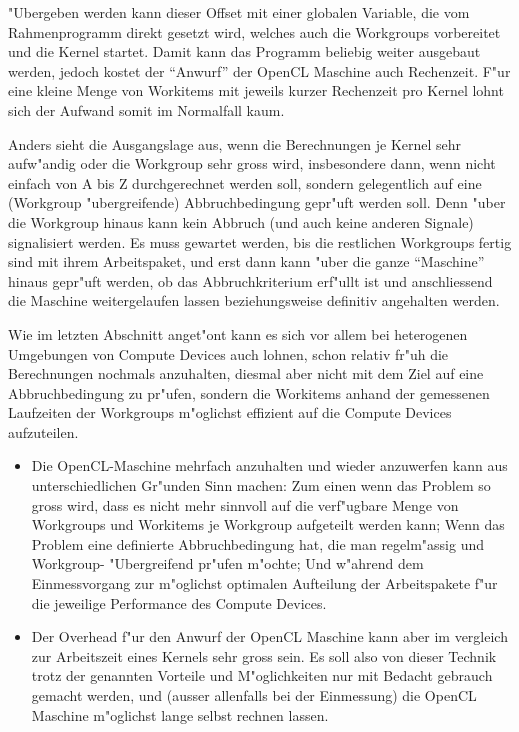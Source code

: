\begin{refsection}
"Ubergeben werden kann dieser Offset mit einer globalen Variable, die vom
Rahmenprogramm direkt gesetzt wird, welches auch die Workgroups vorbereitet 
und die Kernel startet. Damit kann das Programm beliebig weiter ausgebaut
werden, jedoch kostet der ``Anwurf'' der OpenCL Maschine auch Rechenzeit.
F"ur eine kleine Menge von Workitems mit jeweils kurzer Rechenzeit pro Kernel
lohnt sich der Aufwand somit im Normalfall kaum. 

Anders sieht die 
Ausgangslage aus, wenn die Berechnungen je Kernel sehr aufw"andig oder
die Workgroup sehr gross wird, insbesondere dann, wenn nicht einfach von 
A bis Z durchgerechnet werden soll, sondern gelegentlich auf eine 
(Workgroup "ubergreifende) Abbruchbedingung gepr"uft werden soll. Denn
"uber die Workgroup hinaus kann kein Abbruch (und auch keine anderen 
Signale) signalisiert werden. Es muss gewartet werden, bis die restlichen
Workgroups fertig sind mit ihrem Arbeitspaket, und erst dann kann "uber
die ganze ``Maschine'' hinaus gepr"uft werden, ob das Abbruchkriterium
erf"ullt ist und anschliessend die Maschine weitergelaufen lassen 
beziehungsweise definitiv angehalten werden.

Wie im letzten Abschnitt anget"ont kann es sich vor allem bei heterogenen 
Umgebungen von Compute Devices auch lohnen, schon relativ fr"uh die 
Berechnungen nochmals anzuhalten, diesmal aber nicht mit dem Ziel auf eine
Abbruchbedingung zu pr"ufen, sondern die Workitems anhand der gemessenen
Laufzeiten der Workgroups m"oglichst effizient auf die Compute Devices
aufzuteilen.

\begin{itemize}
 \item Die OpenCL-Maschine mehrfach anzuhalten und wieder anzuwerfen 
       kann aus unterschiedlichen Gr"unden Sinn machen: Zum einen
       wenn das Problem so gross wird, dass es nicht mehr sinnvoll auf 
       die verf"ugbare Menge von Workgroups und Workitems je Workgroup
       aufgeteilt werden kann; Wenn das Problem eine definierte 
       Abbruchbedingung hat, die man regelm"assig und Workgroup-
       "Ubergreifend pr"ufen m"ochte; Und w"ahrend dem Einmessvorgang
       zur m"oglichst optimalen Aufteilung der Arbeitspakete f"ur die 
       jeweilige Performance des Compute Devices.
 \item Der Overhead f"ur den Anwurf der OpenCL Maschine kann aber im 
       vergleich zur Arbeitszeit eines Kernels sehr gross sein. Es soll
       also von dieser Technik trotz der genannten Vorteile und 
       M"oglichkeiten nur mit Bedacht gebrauch gemacht werden, und 
       (ausser allenfalls bei der Einmessung) die OpenCL Maschine
       m"oglichst lange selbst rechnen lassen.
\end{itemize}





\end{refsection}

